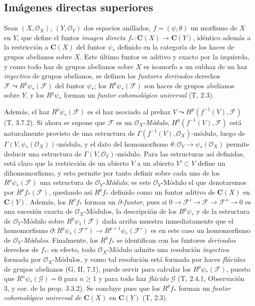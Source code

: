 \subsection{Imágenes directas superiores}
\label{subsection:0.12.2-fr}

\begin{env}[12.2.1]
\label{0.12.2.1-fr}
Sean $(X,\mathcal O_X)$, $(Y,\mathcal O_Y)$ dos espacios anillados,
$f=(\psi,\theta)$ un morfismo de $X$ en $Y$, que define el funtor
\emph{imagen directa}
$f_*:\boldsymbol{C}(X)\longrightarrow\boldsymbol{C}(Y)$,
idéntico además a la restricción a $\boldsymbol{C}(X)$ del funtor $\psi_*$ definido
en la categoría de los haces de grupos abelianos sobre $X$. Este último
funtor es aditivo y exacto por la izquierda, y como todo haz de grupos
abelianos sobre $X$ es isomorfo a un subhaz de un haz \emph{inyectivo} de
grupos abelianos, se definen los \emph{funtores derivados} derechos
$\mathcal F\leadsto R^p\psi_*(\mathcal F)$ del funtor $\psi_*$; los
$R^p\psi_*(\mathcal F)$ son haces de grupos abelianos sobre $Y$, y
los $R^p\psi_*$ forman un \emph{funtor cohomológico universal} (T, 2.3).

Además, el haz $R^p\psi_*(\mathcal F)$ es el haz asociado al
prehaz $V\leadsto H^p(f^{-1}(V),\mathcal F)$ (T, 3.7.2). Si ahora
se supone que $\mathcal F$ es un $\mathcal O_X$-\emph{Módulo},
$H^p(f^{-1}(V),\mathcal F)$ está naturalmente provisto de una estructura de
$\Gamma(f^{-1}(V),\mathcal O_X)$-módulo, luego de
$\Gamma(V,\psi_*(\mathcal O_X))$-módulo, y el dato del homomorfismo
$\theta:\mathcal O_Y\to\psi_*(\mathcal O_X)$ permite deducir una
estructura de $\Gamma(V,\mathcal O_Y)$-módulo. Para las estructuras así
definidas, está claro que la restricción de un abierto $V$ a un abierto
$V'\subset V$ define un dihomomorfismo, y esto permite por tanto definir sobre
cada uno de los $R^p\psi_*(\mathcal F)$ una estructura de $\mathcal O_Y$-\emph{Módulo};
es este $\mathcal O_Y$-Módulo el que denotaremos por $R^p f_*(\mathcal F)$,
quedando así $R^p f_*$ definido como un funtor aditivo de $\boldsymbol{C}(X)$ en
$\boldsymbol{C}(Y)$. Además, los $R^p f_*$ forman un \emph{$\partial$-funtor}, pues si
$0\longrightarrow\mathcal F'\longrightarrow\mathcal F
\longrightarrow\mathcal F''\longrightarrow0$
es una sucesión exacta de $\mathcal O_X$-Módulos, la descripción de los
$R^p\psi_*$ y de la estructura de $\mathcal O_Y$-Módulo sobre
$R^p\psi_*(\mathcal F)$ dada arriba muestra inmediatamente que
el homomorfismo
$\partial:R^p\psi_*(\mathcal F'')\longrightarrow
R^{p+1}\psi_*(\mathcal F')$
es en este caso un homomorfismo de $\mathcal O_Y$-\emph{Módulos}. Finalmente, los
$R^p f_*$ se identifican con los funtores \emph{derivados} derechos de $f_*$: en efecto,
todo $\mathcal O_X$-Módulo admite una resolución \emph{inyectiva} formada por
$\mathcal O_X$-Módulos, y como tal resolución está formada por haces
\emph{flácidos} de grupos abelianos (G, II, 7.1), puede servir para calcular los
$R^p\psi_*(\mathcal F)$, puesto que $R^n\psi_*(\mathcal G)=0$ para $n\geq1$ y
para todo haz \emph{flácido} $\mathcal G$ (T, 2.4.1, Observación 3, y cor. de la
prop. 3.3.2). Se concluye pues que los $R^p f_*$ forman un \emph{funtor
cohomológico universal de} $\boldsymbol{C}(X)$ en $\boldsymbol{C}(Y)$ (T, 2.3).
\end{env}


